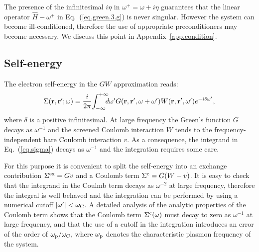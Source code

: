 \documentclass[twocolumn,prb,showpacs,superscriptaddress]{revtex4}
\def\w{\omega}
\def\wp{\omega^\prime}
\def\wc{{\omega_{\rm C}}}
\def\H{\hat{H}}
\def\r{{\bf r}}
\def\rp{{\bf r^\prime}}
\begin{document}
The presence of the infinitesimal $i\eta$ in $\w^+=\w+i\eta$ 
guarantees that the linear operator $\H-\w^+$ in Eq.\ (\ref{eq.green.3.g}) is never singular.
However the system can become ill-conditioned, therefore the use of appropriate
preconditioners may become necessary. We discuss this point
in Appendix~\ref{app.condition}.

\subsection{Self-energy}\label{sec.sigma}

The electron self-energy in the $GW$ approximation reads:\cite{hl86}
  \begin{equation} \label{eq.sigma}
  \Sigma(\r,\rp;\w) = \frac{i}{2\pi} \! \int_{-\infty}^{+\infty} \!\!\!\!d\wp 
    G(\r,\rp,\w+\wp) W(\r,\rp,\wp) e^{-i\delta\wp},
  \end{equation}
where $\delta$ is a positive infinitesimal. 
At large frequency the Green's function $G$ decays as $\w^{-1}$ and 
the screened Coulomb interaction $W$ tends to the frequency-independent
bare Coulomb interaction $v$. As a consequence, the integrand in Eq.\ (\ref{eq.sigma}) 
decays as $\w^{-1}$ and the integration requires some care.

For this purpose it is convenient to split the self-energy into an exchange contribution 
$\Sigma^{\rm ex}=Gv$ and a Coulomb term $\Sigma^{\rm c}=G(W-v)$.\cite{blochl}
It is easy to check that the integrand in the Coulmb term decays as 
$\w^{-2}$ at large frequency, therefore the integral is well behaved and the 
integration can be performed by using a numerical cutoff $|\wp|< \wc$.
A detailed analysis of the analytic properties of the Coulomb term shows 
that the Coulomb term $\Sigma^{\rm c}(\w)$ must decay to zero as $\w^{-1}$ 
at large frequency, and that the use of a cutoff in the integration 
introduces an error of the order of $\w_{\rm p}/\wc$, where $\w_{\rm p}$ denotes
the characteristic plasmon frequency of the system.
\end{document}
